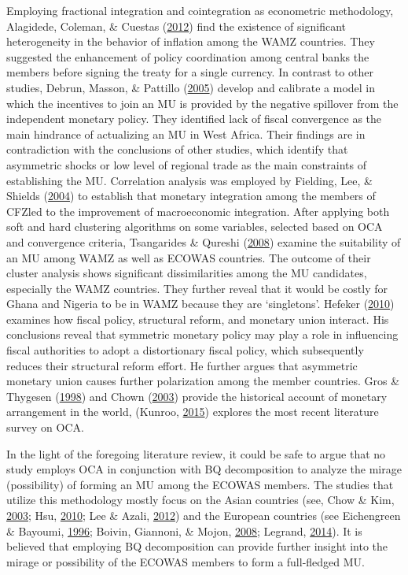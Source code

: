\documentclass[]{article}
\begin{document}
Employing fractional integration and cointegration as econometric methodology, Alagidede, Coleman, \& Cuestas (\protect\hyperlink{ref-ALAGIDEDE2012460}{2012}) find the existence of significant heterogeneity in the behavior of inflation among the WAMZ countries. They suggested the enhancement of policy coordination among central banks the members before signing the treaty for a single currency. In contrast to other studies, Debrun, Masson, \& Pattillo (\protect\hyperlink{ref-debrun2005monetary}{2005}) develop and calibrate a model in which the incentives to join an MU is provided by the negative spillover from the independent monetary policy. They identified lack of fiscal convergence as the main hindrance of actualizing an MU in West Africa. Their findings are in contradiction with the conclusions of other studies, which identify that asymmetric shocks or low level of regional trade as the main constraints of establishing the MU. Correlation analysis was employed by Fielding, Lee, \& Shields (\protect\hyperlink{ref-Fielding2004}{2004}) to establish that monetary integration among the members of \ac{CFZ}led to the improvement of macroeconomic integration. After applying both soft and hard clustering algorithms on some variables, selected based on OCA and convergence criteria, Tsangarides \& Qureshi (\protect\hyperlink{ref-TSANGARIDES20081261}{2008}) examine the suitability of an MU among WAMZ as well as ECOWAS countries. The outcome of their cluster analysis shows significant dissimilarities among the MU candidates, especially the WAMZ countries. They further reveal that it would be costly for Ghana and Nigeria to be in WAMZ because they are `singletons'. Hefeker (\protect\hyperlink{ref-hefeker2010fiscal}{2010}) examines how fiscal policy, structural reform, and monetary union interact. His conclusions reveal that symmetric monetary policy may play a role in influencing fiscal authorities to adopt a distortionary fiscal policy, which subsequently reduces their structural reform effort. He further argues that asymmetric monetary union causes further polarization among the member countries. Gros \& Thygesen (\protect\hyperlink{ref-gros1998european}{1998}) and Chown (\protect\hyperlink{ref-chown2003history}{2003}) provide the historical account of monetary arrangement in the world, (Kunroo, \protect\hyperlink{ref-Kunroo2015}{2015}) explores the most recent literature survey on OCA.

In the light of the foregoing literature review, it could be safe to argue that no study employs OCA in conjunction with BQ decomposition to analyze the mirage (possibility) of forming an MU among the ECOWAS members. The studies that utilize this methodology mostly focus on the Asian countries (see, Chow \& Kim, \protect\hyperlink{ref-Chow2003}{2003}; Hsu, \protect\hyperlink{ref-hsu2010common}{2010}; Lee \& Azali, \protect\hyperlink{ref-lee2012east}{2012}) and the European countries (see Eichengreen \& Bayoumi, \protect\hyperlink{ref-eichengreen1996asia}{1996}; Boivin, Giannoni, \& Mojon, \protect\hyperlink{ref-Boivin2008}{2008}; Legrand, \protect\hyperlink{ref-LEGRAND2014136}{2014}). It is believed that employing BQ decomposition can provide further insight into the mirage or possibility of the ECOWAS members to form a full-fledged MU.
\end{document}
